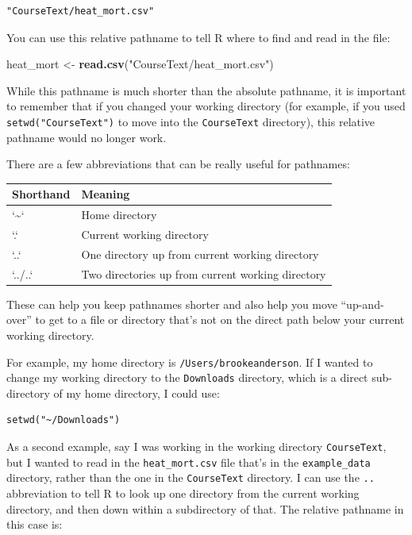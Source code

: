 \documentclass[]{book}
\makeatletter
\newenvironment{Shaded}{\begin{snugshade}}{\end{snugshade}}
\newcommand{\KeywordTok}[1]{\textcolor[rgb]{0.13,0.29,0.53}{\textbf{{#1}}}}
\newcommand{\StringTok}[1]{\textcolor[rgb]{0.31,0.60,0.02}{{#1}}}
\newcommand{\NormalTok}[1]{{#1}}
\newenvironment{kframe}{%
\medskip{}
\setlength{\fboxsep}{.8em}
 \def\at@end@of@kframe{}%
 \ifinner\ifhmode%
  \def\at@end@of@kframe{\end{minipage}}%
  \begin{minipage}{\columnwidth}%
 \fi\fi%
 \def\FrameCommand##1{\hskip\@totalleftmargin \hskip-\fboxsep
 \colorbox{shadecolor}{##1}\hskip-\fboxsep
     \hskip-\linewidth \hskip-\@totalleftmargin \hskip\columnwidth}%
 \MakeFramed {\advance\hsize-\width
   \@totalleftmargin\z@ \linewidth\hsize
   \@setminipage}}%
 {\par\unskip\endMakeFramed%
 \at@end@of@kframe}
\renewenvironment{Shaded}{\begin{kframe}}{\end{kframe}}
\makeatother
\begin{document}
\begin{verbatim}
"CourseText/heat_mort.csv"
\end{verbatim}

You can use this relative pathname to tell R where to find and read in
the file:

\begin{Shaded}
\begin{Highlighting}[]
\NormalTok{heat_mort <-}\StringTok{ }\KeywordTok{read.csv}\NormalTok{(}\StringTok{"CourseText/heat_mort.csv"}\NormalTok{)}
\end{Highlighting}
\end{Shaded}

While this pathname is much shorter than the absolute pathname, it is
important to remember that if you changed your working directory (for
example, if you used \texttt{setwd("CourseText")} to move into the
\texttt{CourseText} directory), this relative pathname would no longer
work.

There are a few abbreviations that can be really useful for pathnames:

\begin{tabular}{l|l}
\hline
Shorthand & Meaning\\
\hline
`\textasciitilde{}` & Home directory\\
\hline
`.` & Current working directory\\
\hline
`..` & One directory up from current working directory\\
\hline
`../..` & Two directories up from current working directory\\
\hline
\end{tabular}

These can help you keep pathnames shorter and also help you move
``up-and-over'' to get to a file or directory that's not on the direct
path below your current working directory.

For example, my home directory is \texttt{/Users/brookeanderson}. If I
wanted to change my working directory to the \texttt{Downloads}
directory, which is a direct sub-directory of my home directory, I could
use:

\begin{verbatim}
setwd("~/Downloads")
\end{verbatim}

As a second example, say I was working in the working directory
\texttt{CourseText}, but I wanted to read in the \texttt{heat\_mort.csv}
file that's in the \texttt{example\_data} directory, rather than the one
in the \texttt{CourseText} directory. I can use the \texttt{..}
abbreviation to tell R to look up one directory from the current working
directory, and then down within a subdirectory of that. The relative
pathname in this case is:
\end{document}
